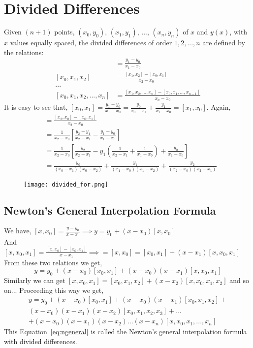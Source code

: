 \documentclass[aima203_lecturenotes_ku.tex]{subfiles}
\begin{document}
\section{Divided Differences}
Given $(n+1)$ points, $(x_0,y_0), \, (x_1,y_1), \, ..., \, (x_n,y_n)$ of $x$ and $y(x)$, with $x$ values equally spaced, the divided differences of order $1,2,...,n$ are defined by the relations:
\begin{align*}
  [x_0,x_1] &= \frac{y_1 - y_0}{x_1 - x_0} \\[1mm]
  [x_0,x_1,x_2] &= \frac{[x_1, x_2]-[x_0,x_1]}{x_2 - x_0} \\[1mm]
  ... \\
  [x_0,x_1,x_2,...,x_n] &= \frac{[x_1, x_2,...,x_n]-[x_0,x_1,...,x_{n-1}]}{x_n - x_0}
\end{align*}
It is easy to see that, $\displaystyle [x_0,x_1] = \frac{y_1 - y_0}{x_1 - x_0} = \frac{y_0}{x_0 - x_1} + \frac{y_1}{x_1 - x_0} = [x_1,x_0]$.
Again,
\begin{align*}
  [x_0,x_1,x_2] &= \frac{[x_2, x_0]-[x_0,x_1]}{x_2 - x_0} \\[1mm]
                &= \frac{1}{x_2 - x_0} \left [ \frac{y_2- y_1}{x_2 - x_1} - \frac{y_1 - y_0}{x_1 - x_0} \right ] \\[1mm]
                  &= \frac{1}{x_2 - x_0} \left [ \frac{y_2}{x_2 - x_1} -y_1 \left ( \frac{1}{x_2-x_1} + \frac{1}{x_1 - x_0} \right ) + \frac{y_0}{x_1 - x_0} \right ] \\[1mm]
  &= \frac{y_0}{(x_0-x_1)(x_0-x_2)} + \frac{y_1}{(x_1-x_0)(x_1-x_2)} + \frac{y_2}{(x_2-x_0)(x_2-x_1)}
\end{align*}
\begin{figure}[h]
  \centering
\texttt{[image: divided\_for.png]}
\end{figure}
\subsection{Newton's General Interpolation Formula}
We have,  $\displaystyle [x,x_0] = \frac{y - y_0}{x - x_0} \implies y = y_0 + (x-x_0)[x,x_0]$ \\[1mm]
And $\displaystyle [x,x_0,x_1] =  \frac{[x, x_0]-[x_0,x_1]}{x - x_1} \implies = [x,x_0] = [x_0,x_1] + (x-x_1)[x,x_0,x_1]$ \\[1mm]
From these two relations we get,
\begin{equation}
  \label{ninter}
  y = y_0 + (x-x_0)[x_0,x_1] + (x-x_0)(x-x_1)[x,x_0,x_1]
\end{equation}
Similarly we can get $[x,x_0,x_1] =  [x_0,x_1,x_2] + (x-x_2)[x,x_0,x_1,x_2]$ and so on...
Proceeding this way we get,
\begin{equation}
  \label{eq:ngeneral}
  \begin{gathered}
    y = y_0 + (x-x_0)[x_0,x_1] + (x-x_0)(x-x_1)[x_0,x_1,x_2] + \\[1mm]
    (x-x_0)(x-x_1)(x-x_2)[x_0,x_1,x_2,x_3] + ... \\[1mm]
    + (x-x_0)(x-x_1)(x-x_2)...(x-x_n)[x,x_0,x_1,...,x_n]
  \end{gathered}
  \end{equation}
  This Equation~\ref{eq:ngeneral} is called the Newton's general interpolation formula with divided differences.
\end{document}
